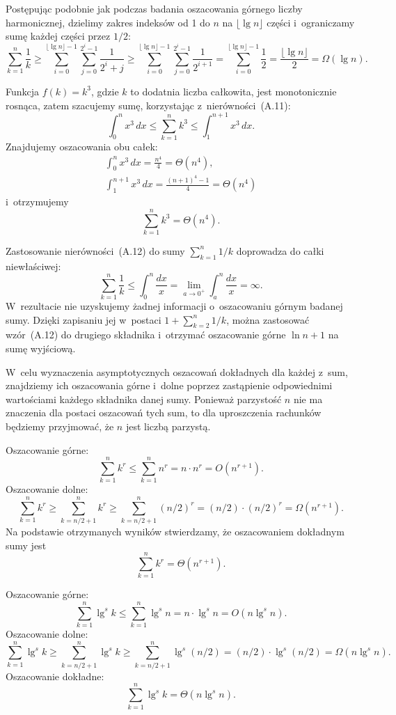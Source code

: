\exercise %
Postępując podobnie jak podczas badania oszacowania górnego  liczby harmonicznej, dzielimy zakres indeksów od 1 do $n$ na $\lfloor\lg n\rfloor$ części i~ograniczamy sumę każdej części przez $1/2$:
\[
    \sum_{k=1}^n\frac{1}{k} \ge \sum_{i=0}^{\lfloor\lg n\rfloor-1}\sum_{j=0}^{2^i-1}\frac{1}{2^i+j} \ge \sum_{i=0}^{\lfloor\lg n\rfloor-1}\sum_{j=0}^{2^i-1}\frac{1}{2^{i+1}} = \sum_{i=0}^{\lfloor\lg n\rfloor-1}\frac{1}{2} = \frac{\lfloor\lg n\rfloor}{2} = \Omega(\lg n).
\]

\exercise %
Funkcja $f(k)=k^3$, gdzie $k$ to dodatnia liczba całkowita, jest monotonicznie rosnąca, zatem szacujemy sumę, korzystając z~nierówności~(A.11):
\[
	\int_0^nx^3\,dx \le \sum_{k=1}^nk^3 \le \int_1^{n+1}x^3\,dx.
\]
Znajdujemy oszacowania obu całek:
\begin{gather*}
	\int_0^nx^3\,dx = \frac{n^4}{4} = \Theta(n^4), \\[2mm]
	\int_1^{n+1}x^3\,dx = \frac{(n+1)^4-1}{4} = \Theta(n^4)
\end{gather*}
i~otrzymujemy
\[
	\sum_{k=1}^nk^3 = \Theta(n^4).
\]

\exercise %
Zastosowanie nierówności~(A.12) do sumy $\sum_{k=1}^n1/k$ doprowadza do całki niewłaściwej:
\[
	\sum_{k=1}^n\frac{1}{k} \le \int_0^n\frac{dx}{x} = \lim_{a\to0^+}\int_a^n\frac{dx}{x} = \infty.
\]
W~rezultacie nie uzyskujemy żadnej informacji o~oszacowaniu górnym badanej sumy. Dzięki zapisaniu jej w~postaci $1+\sum_{k=2}^n1/k$, można zastosować wzór~(A.12) do drugiego składnika i~otrzymać oszacowanie górne $\ln n+1$ na sumę wyjściową.

\problems

W~celu wyznaczenia asymptotycznych oszacowań dokładnych dla każdej z~sum, znajdziemy ich oszacowania górne i~dolne poprzez zastąpienie odpowiednimi wartościami każdego składnika danej sumy. Ponieważ parzystość $n$ nie ma znaczenia dla postaci oszacowań tych sum, to dla uproszczenia rachunków będziemy przyjmować, że $n$ jest liczbą parzystą.

\subproblem %
Oszacowanie górne:
\[
    \sum_{k=1}^nk^r \le \sum_{k=1}^nn^r = n\cdot n^r = O(n^{r+1}).
\]
Oszacowanie dolne:
\[
    \sum_{k=1}^nk^r \ge \sum_{k=n/2+1}^nk^r \ge \sum_{k=n/2+1}^n(n/2)^r = (n/2)\cdot(n/2)^r = \Omega(n^{r+1}).
\]
Na podstawie otrzymanych wyników stwierdzamy, że oszacowaniem dokładnym sumy jest
\[
    \sum_{k=1}^nk^r = \Theta(n^{r+1}).
\]

\subproblem %
Oszacowanie górne:
\[
    \sum_{k=1}^n\lg^sk \le \sum_{k=1}^n\lg^sn = n\cdot\lg^sn = O(n\lg^sn).
\]
Oszacowanie dolne:
\[
    \sum_{k=1}^n\lg^sk \ge \sum_{k=n/2+1}^n\lg^sk \ge \sum_{k=n/2+1}^n\lg^s(n/2) = (n/2)\cdot\lg^s(n/2) = \Omega(n\lg^sn).
\]
Oszacowanie dokładne:
\[
    \sum_{k=1}^n\lg^sk = \Theta(n\lg^sn).
\]

